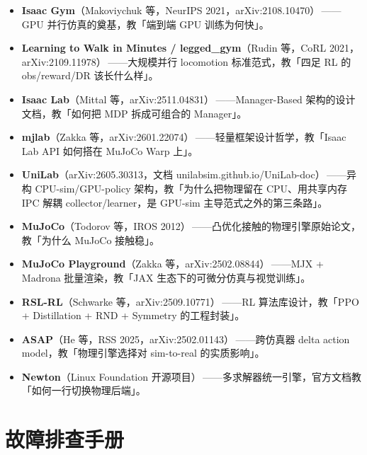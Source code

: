\begin{itemize}
  \item \textbf{Isaac Gym}（Makoviychuk 等，NeurIPS 2021，arXiv:2108.10470）\,\cite{makoviychuk2021isaacgym}——GPU 并行仿真的奠基，教「端到端 GPU 训练为何快」。
  \item \textbf{Learning to Walk in Minutes / legged\_gym}（Rudin 等，CoRL 2021，arXiv:2109.11978）\,\cite{rudin2021minutes}——大规模并行 locomotion 标准范式，教「四足 RL 的 obs/reward/DR 该长什么样」。
  \item \textbf{Isaac Lab}（Mittal 等，arXiv:2511.04831）\,\cite{mittal2025isaaclab}——Manager-Based 架构的设计文档，教「如何把 MDP 拆成可组合的 Manager」。
  \item \textbf{mjlab}（Zakka 等，arXiv:2601.22074）\,\cite{mjlab2026}——轻量框架设计哲学，教「Isaac Lab API 如何搭在 MuJoCo Warp 上」。
  \item \textbf{UniLab}（arXiv:2605.30313，文档 unilabsim.github.io/UniLab-doc）\,\cite{unilab2026}——异构 CPU-sim/GPU-policy 架构，教「为什么把物理留在 CPU、用共享内存 IPC 解耦 collector/learner，是 GPU-sim 主导范式之外的第三条路」。
  \item \textbf{MuJoCo}（Todorov 等，IROS 2012）\,\cite{todorov2012mujoco}——凸优化接触的物理引擎原始论文，教「为什么 MuJoCo 接触稳」。
  \item \textbf{MuJoCo Playground}（Zakka 等，arXiv:2502.08844）\,\cite{zakka2025playground}——MJX + Madrona 批量渲染，教「JAX 生态下的可微分仿真与视觉训练」。
  \item \textbf{RSL-RL}（Schwarke 等，arXiv:2509.10771）\,\cite{schwarke2025rslrl}——RL 算法库设计，教「PPO + Distillation + RND + Symmetry 的工程封装」。
  \item \textbf{ASAP}（He 等，RSS 2025，arXiv:2502.01143）\,\cite{he2025asap}——跨仿真器 delta action model，教「物理引擎选择对 sim-to-real 的实质影响」。
  \item \textbf{Newton}（Linux Foundation 开源项目）\,\cite{newton2025}——多求解器统一引擎，官方文档教「如何一行切换物理后端」。
\end{itemize}

\section*{故障排查手册}
\label{sec:rlmc-eco-trouble}

